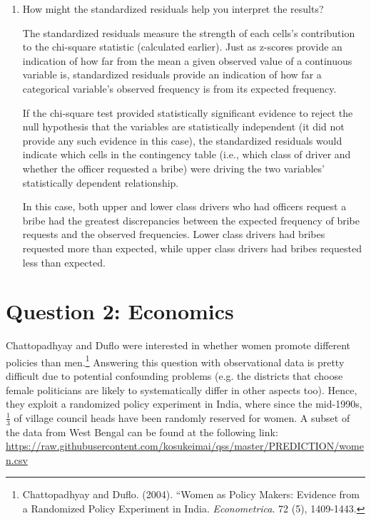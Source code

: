 \documentclass[12pt,letterpaper]{article}
\begin{document}
\begin{enumerate}
	\item [(d)] How might the standardized residuals help you interpret the results?  \vspace{0.5cm}
	
	The standardized residuals measure the strength of each cells's contribution to the chi-square statistic (calculated earlier). Just as z-scores provide an indication of how far from the mean a given observed value of a continuous variable is, standardized residuals provide an indication of how far a categorical variable's observed frequency is from its expected frequency.
	
	If the chi-square test provided statistically significant evidence to reject the null hypothesis that the variables are statistically independent (it did not provide any such evidence in this case), the standardized residuals would indicate which cells in the contingency table (i.e., which class of driver and whether the officer requested a bribe) were driving the two variables' statistically dependent relationship. 
	
	In this case, both upper and lower class drivers who had officers request a bribe had the greatest discrepancies between the expected frequency of bribe requests and the observed frequencies. Lower class drivers had bribes requested more than expected, while upper class drivers had bribes requested less than expected. 
	
\end{enumerate}
\newpage

\section*{Question 2: Economics}
Chattopadhyay and Duflo were interested in whether women promote different policies than men.\footnote{Chattopadhyay and Duflo. (2004). ``Women as Policy Makers: Evidence from a Randomized Policy Experiment in India. \textit{Econometrica}. 72 (5), 1409-1443.} Answering this question with observational data is pretty difficult due to potential confounding problems (e.g. the districts that choose female politicians are likely to systematically differ in other aspects too). Hence, they exploit a randomized policy experiment in India, where since the mid-1990s, $\frac{1}{3}$ of village council heads have been randomly reserved for women. A subset of the data from West Bengal can be found at the following link: \url{https://raw.githubusercontent.com/kosukeimai/qss/master/PREDICTION/women.csv}\\
\end{document}
